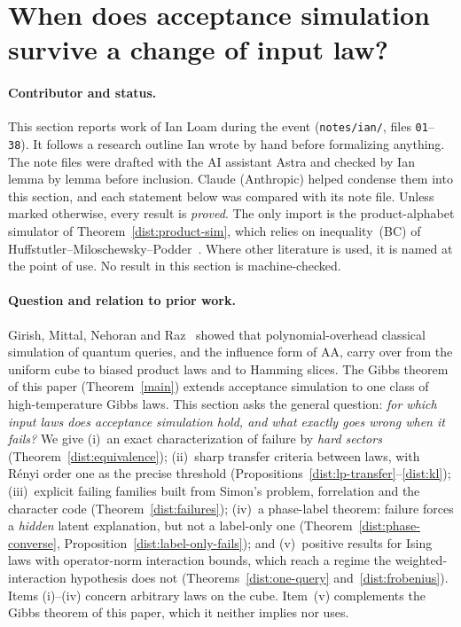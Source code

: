 \documentclass[11pt]{article}
\theoremstyle{definition}\newtheorem{definition}[theorem]{Definition}
\theoremstyle{remark}\newtheorem{remark}[theorem]{Remark}
\begin{document}
\providecommand{\Cov}{\operatorname{Cov}}
\providecommand{\R}{\mathbb R}
\providecommand{\Hard}{\operatorname{Hard}}

\section{When does acceptance simulation survive a change of input law?}\label{sec:distributional}

\paragraph{Contributor and status.}
This section reports work of Ian Loam during the event (\texttt{notes/ian/},
files \texttt{01}--\texttt{38}). It follows a research outline Ian wrote by hand
before formalizing anything. The note files were drafted with the AI assistant
Astra and checked by Ian lemma by lemma before inclusion. Claude (Anthropic)
helped condense them into this section, and each statement below was compared
with its note file. Unless marked otherwise, every result is \emph{proved}. The
only import is the product-alphabet simulator of
Theorem~\ref{dist:product-sim}, which relies on inequality~(BC) of
Huffstutler--Miloschewsky--Podder~\cite{HMP26}. Where other literature is used,
it is named at the point of use. No result in this section is machine-checked.

\paragraph{Question and relation to prior work.}
Girish, Mittal, Nehoran and Raz~\cite{GMNR26} showed that polynomial-overhead
classical simulation of quantum queries, and the influence form of AA, carry
over from the uniform cube to biased product laws and to Hamming slices. The
Gibbs theorem of this paper (Theorem~\ref{main}) extends acceptance simulation to
one class of high-temperature Gibbs laws. This section asks the general
question: \emph{for which input laws does acceptance simulation hold, and what
exactly goes wrong when it fails?} We give
(i)~an exact characterization of failure by \emph{hard sectors}
(Theorem~\ref{dist:equivalence});
(ii)~sharp transfer criteria between laws, with Rényi order one as the precise
threshold (Propositions~\ref{dist:lp-transfer}--\ref{dist:kl});
(iii)~explicit failing families built from Simon's problem, forrelation and the
character code (Theorem~\ref{dist:failures});
(iv)~a phase-label theorem: failure forces a \emph{hidden} latent explanation,
but not a label-only one (Theorem~\ref{dist:phase-converse},
Proposition~\ref{dist:label-only-fails}); and
(v)~positive results for Ising laws with operator-norm interaction bounds,
which reach a regime the weighted-interaction hypothesis does not
(Theorems~\ref{dist:one-query} and~\ref{dist:frobenius}).
Items (i)--(iv) concern arbitrary laws on the cube. Item~(v) complements the
Gibbs theorem of this paper, which it neither implies nor uses.
\end{document}
